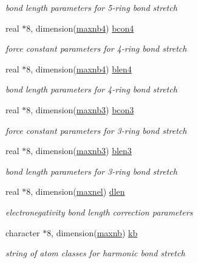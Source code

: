 \begin{DoxyCompactItemize}
\begin{DoxyCompactList}\small\item\em bond length parameters for 5-\/ring bond stretch \end{DoxyCompactList}\item 
real $\ast$8, dimension(\hyperlink{classkbonds_a1146d8cd8643971889024141fc7b1278}{maxnb4}) \hyperlink{classkbonds_abd26bb67713fa4f4f0b92b9e2ec76ce7}{bcon4}
\begin{DoxyCompactList}\small\item\em force constant parameters for 4-\/ring bond stretch \end{DoxyCompactList}\item 
real $\ast$8, dimension(\hyperlink{classkbonds_a1146d8cd8643971889024141fc7b1278}{maxnb4}) \hyperlink{classkbonds_ad18f49c893ecbd07b6ceaf640eb8bb5c}{blen4}
\begin{DoxyCompactList}\small\item\em bond length parameters for 4-\/ring bond stretch \end{DoxyCompactList}\item 
real $\ast$8, dimension(\hyperlink{classkbonds_aa8e2e75495d2bb801b4ee3410c933ba1}{maxnb3}) \hyperlink{classkbonds_a8f800b1634aef288ebc94c6e9273cf22}{bcon3}
\begin{DoxyCompactList}\small\item\em force constant parameters for 3-\/ring bond stretch \end{DoxyCompactList}\item 
real $\ast$8, dimension(\hyperlink{classkbonds_aa8e2e75495d2bb801b4ee3410c933ba1}{maxnb3}) \hyperlink{classkbonds_ae67999ffcbf08c7bbf51e16fe88f9a35}{blen3}
\begin{DoxyCompactList}\small\item\em bond length parameters for 3-\/ring bond stretch \end{DoxyCompactList}\item 
real $\ast$8, dimension(\hyperlink{classkbonds_a6db85c30f12f7ced42381f0176090d23}{maxnel}) \hyperlink{classkbonds_a045e5974050bfb0a5fc0cffa235150b8}{dlen}
\begin{DoxyCompactList}\small\item\em electronegativity bond length correction parameters \end{DoxyCompactList}\item 
character $\ast$8, dimension(\hyperlink{classkbonds_ae14cb6057f6b902041d325f442bb4eb4}{maxnb}) \hyperlink{classkbonds_ab73fca798f003a8ca65b167648b1aaa8}{kb}
\begin{DoxyCompactList}\small\item\em string of atom classes for harmonic bond stretch \end{DoxyCompactList}\item 

\end{DoxyCompactItemize}
